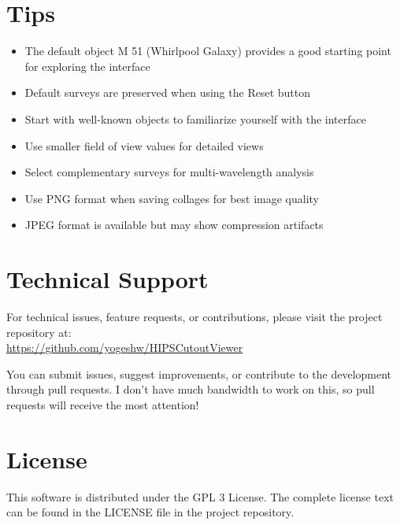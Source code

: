 \documentclass{article}
\begin{document}
\section{Tips}
\begin{itemize}
    \item The default object M 51 (Whirlpool Galaxy) provides a good starting point for exploring the interface
    \item Default surveys are preserved when using the Reset button
    \item Start with well-known objects to familiarize yourself with the interface
    \item Use smaller field of view values for detailed views
    \item Select complementary surveys for multi-wavelength analysis
    \item Use PNG format when saving collages for best image quality
    \item JPEG format is available but may show compression artifacts
\end{itemize}

\section{Technical Support}
For technical issues, feature requests, or contributions, please visit the project repository at:\\
\url{https://github.com/yogeshw/HIPSCutoutViewer}

You can submit issues, suggest improvements, or contribute to the development through pull requests. I don't have much bandwidth to work on this, so pull requests will receive the most attention!

\section{License}
This software is distributed under the GPL 3 License. The complete license text can be found in the LICENSE file in the project repository.
\end{document}

